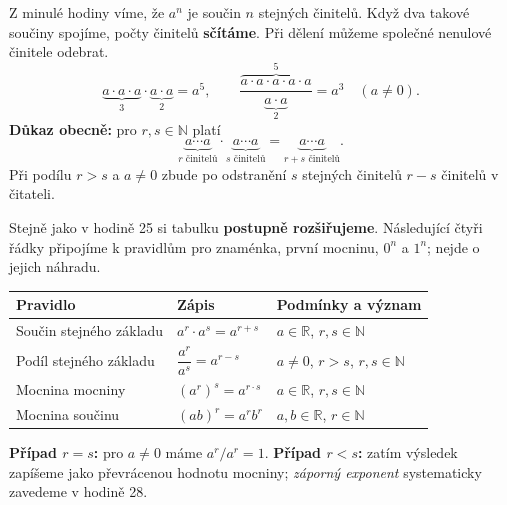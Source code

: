 \documentclass[11pt,a4paper]{article}
\begin{document}

Z minulé hodiny víme, že $a^n$ je součin $n$ stejných činitelů.
Když dva takové součiny spojíme, počty činitelů \textbf{sčítáme}.
Při dělení můžeme společné nenulové činitele odebrat.
\[
\underbrace{a\cdot a\cdot a}_{3}\cdot
\underbrace{a\cdot a}_{2}=a^5,
\qquad
\frac{\overbrace{a\cdot a\cdot a\cdot a\cdot a}^{5}}{\underbrace{a\cdot a}_{2}}=a^3
\quad(a\ne0).
\]
\textbf{Důkaz obecně:} pro $r,s\in\mathbb N$ platí
\[
\underbrace{a\cdots a}_{r\text{ činitelů}}\cdot
\underbrace{a\cdots a}_{s\text{ činitelů}}
=\underbrace{a\cdots a}_{r+s\text{ činitelů}}.
\]
Při podílu $r>s$ a $a\ne0$ zbude po odstranění $s$ stejných
činitelů $r-s$ činitelů v čitateli.

Stejně jako v hodině 25 si tabulku \textbf{postupně rozšiřujeme}.
Následující čtyři řádky připojíme k pravidlům pro znaménka,
první mocninu, $0^n$ a $1^n$; nejde o jejich náhradu.
\begin{center}
\small
\begin{tabularx}{\linewidth}{@{}>{\raggedright\arraybackslash}p{31mm}>{\raggedright\arraybackslash}p{50mm}X@{}}
\toprule
\textbf{Pravidlo} & \textbf{Zápis} & \textbf{Podmínky a význam} \\
\midrule
Součin stejného základu & $a^r\cdot a^s=a^{r+s}$ & $a\in\mathbb R$, $r,s\in\mathbb N$ \\
Podíl stejného základu & $\dfrac{a^r}{a^s}=a^{r-s}$ & $a\ne0$, $r>s$, $r,s\in\mathbb N$ \\
Mocnina mocniny & $(a^r)^s=a^{r\cdot s}$ & $a\in\mathbb R$, $r,s\in\mathbb N$ \\
Mocnina součinu & $(ab)^r=a^r b^r$ & $a,b\in\mathbb R$, $r\in\mathbb N$ \\
\bottomrule
\end{tabularx}
\normalsize
\end{center}
\textbf{Případ $r=s$:} pro $a\ne0$ máme $a^r/a^r=1$.
\textbf{Případ $r<s$:} zatím výsledek zapíšeme jako převrácenou
hodnotu mocniny; \emph{záporný exponent} systematicky zavedeme v hodině 28.
\end{document}
